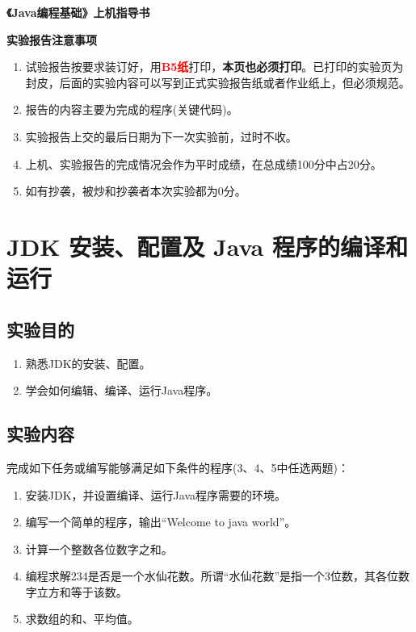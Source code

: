 ﻿\documentclass[cs5size,b5paper,nofonts,twoside]{ctexart}
\begin{document}
\begin{titlepage}
\begin{center}
{\bf 《Java编程基础》上机指导书}
\end{center}
\begin{center}
{\bf 实验报告注意事项}
\end{center}
\begin{enumerate}
\item 试验报告按要求装订好，用{\textcolor{red}{\bf B5纸}}打印，{\bf 本页也必须打印}。已打印的实验页为封皮，后面的实验内容可以写到正式实验报告纸或者作业纸上，但必须规范。
\item 报告的内容主要为完成的程序(关键代码)。
\item 实验报告上交的最后日期为下一次实验前，过时不收。
\item 上机、实验报告的完成情况会作为平时成绩，在总成绩100分中占20分。
\item 如有抄袭，被炒和抄袭者本次实验都为0分。
\end{enumerate}
\end{titlepage}

\clearpage
\section{JDK 安装、配置及 Java 程序的编译和运行}

\subsection{实验目的}
\begin{enumerate}
\item 熟悉JDK的安装、配置。
\item 学会如何编辑、编译、运行Java程序。
\end{enumerate}
\subsection{实验内容}
完成如下任务或编写能够满足如下条件的程序(3、4、5中任选两题)：
\begin{enumerate}
\item 安装JDK，并设置编译、运行Java程序需要的环境。 
\item 编写一个简单的程序，输出“Welcome to java world”。
\item 计算一个整数各位数字之和。
\item 编程求解234是否是一个水仙花数。所谓“水仙花数”是指一个3位数，其各位数字立方和等于该数。
\item 求数组的和、平均值。
\end{enumerate}
\end{document}
